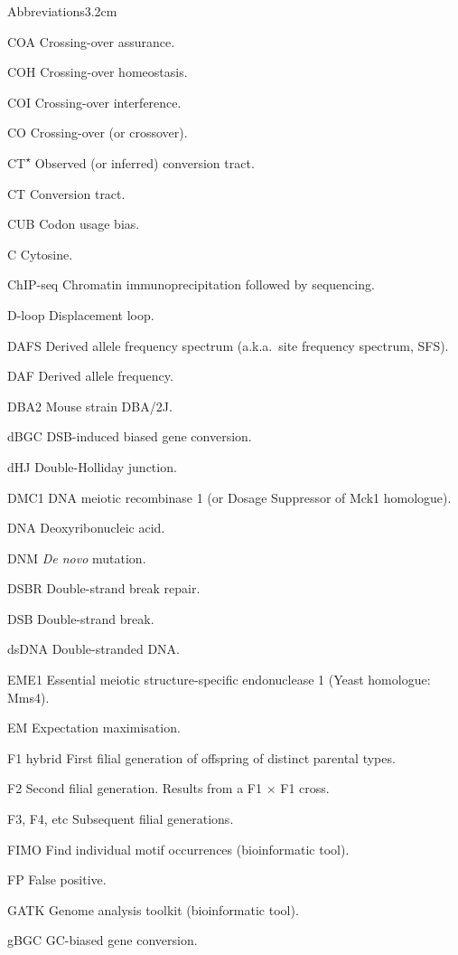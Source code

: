 \begin{mclistof}{Abbreviations}{3.2cm}
\item[COA] Crossing-over assurance.
\item[COH] Crossing-over homeostasis.
\item[COI] Crossing-over interference.
\item[CO] Crossing-over (or crossover).
\item[CT\textsuperscript{$\star$}] Observed (or inferred) conversion tract.
\item[CT] Conversion tract.
\item[CUB] Codon usage bias.
\item[C] Cytosine.
\item[ChIP-seq] Chromatin immunoprecipitation followed by sequencing.
\item[D-loop] Displacement loop.
\item[DAFS] Derived allele frequency spectrum (a.k.a.\ site frequency spectrum, SFS).
\item[DAF] Derived allele frequency.
\item[DBA2] Mouse strain DBA/2J\@.
\item[dBGC] DSB-induced biased gene conversion.
\item[dHJ] Double-Holliday junction.
\item[DMC1] DNA meiotic recombinase 1 (or Dosage Suppressor of Mck1 homologue).
\item[DNA] Deoxyribonucleic acid.
\item[DNM] \textit{De novo} mutation.
\item[DSBR] Double-strand break repair.
\item[DSB] Double-strand break.
\item[dsDNA] Double-stranded DNA\@.
\item[EME1] Essential meiotic structure-specific endonuclease 1 (Yeast homologue: Mms4).
\item[EM] Expectation maximisation.
\item[F1 hybrid] First filial generation of offspring of distinct parental types.
\item[F2] Second filial generation. Results from a F1 $\times$ F1 cross.
\item[F3, F4, etc] Subsequent filial generations.
\item[FIMO] Find individual motif occurrences (bioinformatic tool).
\item[FP] False positive.
\item[GATK] Genome analysis toolkit (bioinformatic tool).
\item[gBGC] GC-biased gene conversion.

\end{mclistof}
